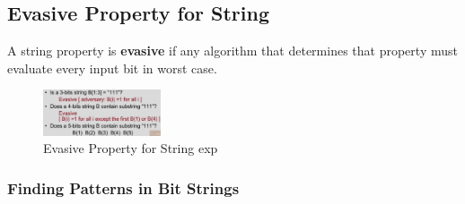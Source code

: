 \subsection{Evasive Property for String}
\begin{definition}
    A string property is \textbf{evasive} if any algorithm that determines that property must evaluate every input bit in worst case.
\end{definition}

\begin{figure}[H]
    \centering
    \includegraphics[width=0.309\textwidth]{pic/DAA5/Evasive Property for String exp}
    \caption{Evasive Property for String exp}
\end{figure}

\subsubsection{Finding Patterns in Bit Strings}


